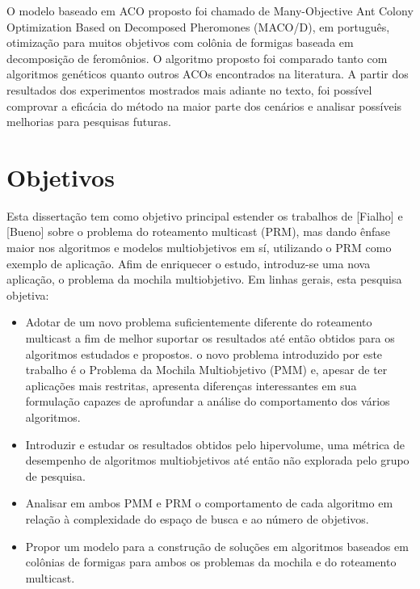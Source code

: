 O modelo baseado em ACO proposto foi chamado de Many-Objective Ant Colony Optimization Based on Decomposed Pheromones (MACO/D), em português, otimização para muitos objetivos com colônia de formigas baseada em decomposição de feromônios. O algoritmo proposto foi comparado tanto com algoritmos genéticos quanto outros ACOs encontrados na literatura. A partir dos resultados dos experimentos mostrados mais adiante no texto, foi possível comprovar a eficácia do método na maior parte dos cenários e analisar possíveis melhorias para pesquisas futuras.
 


\section{Objetivos}
Esta dissertação tem como objetivo principal estender os trabalhos de [Fialho] e [Bueno] sobre o problema do roteamento multicast (PRM), mas dando ênfase maior nos algoritmos e modelos multiobjetivos em sí, utilizando o PRM como exemplo de aplicação. Afim de enriquecer o estudo, introduz-se uma nova aplicação, o problema da mochila multiobjetivo. Em linhas gerais, esta pesquisa objetiva:
 
\begin{itemize}  
	\item Adotar de um novo problema suficientemente diferente do roteamento multicast a fim de melhor suportar os resultados até então obtidos para os algoritmos estudados e propostos. o novo problema introduzido por este trabalho é o Problema da Mochila Multiobjetivo (PMM) e, apesar de ter aplicações mais restritas, apresenta diferenças interessantes em sua formulação capazes de aprofundar a análise do comportamento dos vários algoritmos.
	\item Introduzir e estudar os resultados obtidos pelo hipervolume, uma métrica de desempenho de algoritmos multiobjetivos até então não explorada pelo grupo de pesquisa.
	\item Analisar em ambos PMM e PRM o comportamento de cada algoritmo em relação à complexidade do espaço de busca e ao número de objetivos.
	\item Propor um modelo para a construção de soluções em algoritmos baseados em colônias de formigas para ambos os problemas da mochila e do roteamento multicast.
\end{itemize}


